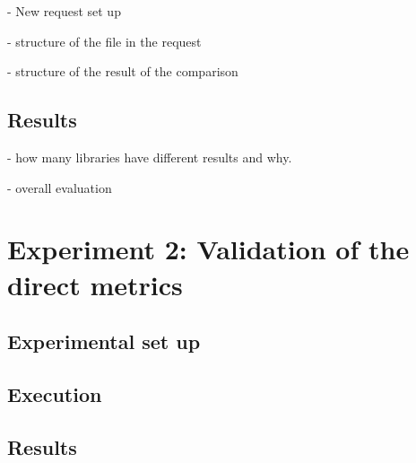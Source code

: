 - New request set up

- structure of the file in the request

- structure of the result of the comparison

\subsection{Results}

- how many libraries have different results and why.

- overall evaluation

\section{Experiment 2: Validation of the direct metrics}
\subsection{Experimental set up}
\subsection{Execution}
\subsection{Results}

